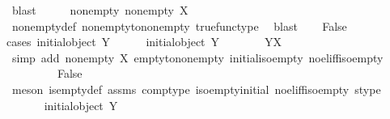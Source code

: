 \begin{isabellebody}
\ blast\isanewline
\isanewline
\ \ \isamarkupfalse%
\ \isamarkupfalse%
\ nonempty{\isacharcolon}{\kern0pt}\ {\isachardoublequoteopen}nonempty\ {\isacharparenleft}{\kern0pt}{\isasymOmega}\isactrlbsup X\isactrlesup {\isacharparenright}{\kern0pt}{\isachardoublequoteclose}\isanewline
\ \ \ \ \isamarkupfalse%
\ nonempty{\isacharunderscore}{\kern0pt}def\ nonempty{\isacharunderscore}{\kern0pt}to{\isacharunderscore}{\kern0pt}nonempty\ true{\isacharunderscore}{\kern0pt}func{\isacharunderscore}{\kern0pt}type\ \isamarkupfalse%
\ blast\isanewline
\ \ \isamarkupfalse%
\ False\isanewline
\ \ \isamarkupfalse%
{\isacharparenleft}{\kern0pt}cases\ {\isachardoublequoteopen}initial{\isacharunderscore}{\kern0pt}object\ Y{\isachardoublequoteclose}{\isacharparenright}{\kern0pt}\isanewline
\ \ \ \ \isamarkupfalse%
\ {\isachardoublequoteopen}initial{\isacharunderscore}{\kern0pt}object\ Y{\isachardoublequoteclose}\isanewline
\ \ \ \ \isamarkupfalse%
\ \isamarkupfalse%
\ {\isachardoublequoteopen}Y\isactrlbsup X\isactrlesup \ {\isasymcong}\ {\isasymemptyset}{\isachardoublequoteclose}\isanewline
\ \ \ \ \ \ \isamarkupfalse%
\ {\isacharparenleft}{\kern0pt}simp\ add{\isacharcolon}{\kern0pt}\ {\isacartoucheopen}nonempty\ X{\isacartoucheclose}\ empty{\isacharunderscore}{\kern0pt}to{\isacharunderscore}{\kern0pt}nonempty\ initial{\isacharunderscore}{\kern0pt}iso{\isacharunderscore}{\kern0pt}empty\ no{\isacharunderscore}{\kern0pt}el{\isacharunderscore}{\kern0pt}iff{\isacharunderscore}{\kern0pt}iso{\isacharunderscore}{\kern0pt}empty{\isacharparenright}{\kern0pt}\ \ \ \ \ \ \isanewline
\ \ \ \ \isamarkupfalse%
\ \isamarkupfalse%
\ False\isanewline
\ \ \ \ \ \ \isamarkupfalse%
\ {\isacharparenleft}{\kern0pt}meson\ is{\isacharunderscore}{\kern0pt}empty{\isacharunderscore}{\kern0pt}def\ assms{\isacharparenleft}{\kern0pt}{}{\isacharparenright}{\kern0pt}\ comp{\isacharunderscore}{\kern0pt}type\ iso{\isacharunderscore}{\kern0pt}empty{\isacharunderscore}{\kern0pt}initial\ no{\isacharunderscore}{\kern0pt}el{\isacharunderscore}{\kern0pt}iff{\isacharunderscore}{\kern0pt}iso{\isacharunderscore}{\kern0pt}empty\ s{\isacharunderscore}{\kern0pt}type{\isacharparenright}{\kern0pt}\ \isanewline
\ \ \isamarkupfalse%
\isanewline
\ \ \ \ \isamarkupfalse%
\ {\isachardoublequoteopen}{\isasymnot}\ initial{\isacharunderscore}{\kern0pt}object\ Y{\isachardoublequoteclose}\isanewline

\end{isabellebody}
